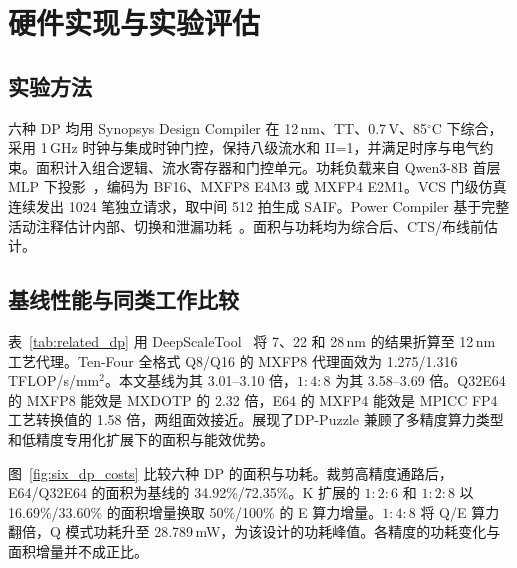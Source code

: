 \section{硬件实现与实验评估}
\label{sec:evaluation}

\subsection{实验方法}
\label{sec:eval_setup}

六种 DP 均用 Synopsys Design Compiler 在 12\,nm、TT、0.7\,V、85$^\circ$C 下综合，采用 1\,GHz 时钟与集成时钟门控，保持八级流水和 II=1，并满足时序与电气约束。面积计入组合逻辑、流水寄存器和门控单元。功耗负载来自 Qwen3-8B 首层 MLP 下投影~\cite{qwen3technicalreport}，编码为 BF16、MXFP8 E4M3 或 MXFP4 E2M1。VCS 门级仿真连续发出 1024 笔独立请求，取中间 512 拍生成 SAIF。Power Compiler 基于完整活动注释估计内部、切换和泄漏功耗~\cite{synopsysActivityPower}。面积与功耗均为综合后、CTS/布线前估计。

\subsection{基线性能与同类工作比较}
\label{sec:reuse_evaluation}
\label{sec:area_breakdown}
\label{sec:related_dp_evaluation}


表~\ref{tab:related_dp} 用 DeepScaleTool~\cite{sarangi2021deepscaletool} 将 7、22 和 28\,nm 的结果折算至 12\,nm 工艺代理。Ten-Four 全格式 Q8/Q16 的 MXFP8 代理面效为 1.275/1.316\,TFLOP/s/mm$^2$。本文基线为其 3.01--3.10 倍，$1{:}4{:}8$ 为其 3.58--3.69 倍。Q32E64 的 MXFP8 能效是 MXDOTP 的 2.32 倍，E64 的 MXFP4 能效是 MPICC FP4 工艺转换值的 1.58 倍，两组面效接近。展现了DP-Puzzle 兼顾了多精度算力类型和低精度专用化扩展下的面积与能效优势。




图~\ref{fig:six_dp_costs} 比较六种 DP 的面积与功耗。裁剪高精度通路后，E64/Q32E64 的面积为基线的 34.92\%/72.35\%。K 扩展的 $1{:}2{:}6$ 和 $1{:}2{:}8$ 以 16.69\%/33.60\% 的面积增量换取 50\%/100\% 的 E 算力增量。$1{:}4{:}8$ 将 Q/E 算力翻倍，Q 模式功耗升至 28.789\,mW，为该设计的功耗峰值。各精度的功耗变化与面积增量并不成正比。

